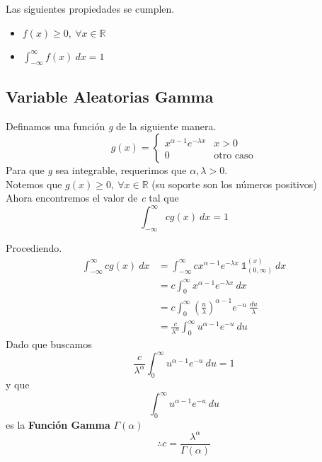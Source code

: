 Las siguientes propiedades se cumplen.
\begin{itemize}
  \item $f(x) \ge 0,~ \forall x \in \mathbb R$
  \item $\int_{-\infty}^{\infty} f(x)~dx = 1$
\end{itemize}



\subsection{Variable Aleatorias Gamma}

Definamos una función \textit{g} de la siguiente manera.
\[g(x) = 
  \begin{cases}
    x^{\alpha - 1}e^{-\lambda x} & x > 0\\
    0 & \text{otro caso}
  \end{cases}
\]
Para que \textit{g} sea integrable, requerimos que $\alpha, \lambda > 0$.\\
Notemos que $g(x) \ge 0,~ \forall x \in \mathbb R$ (su soporte son los números positivos)\\
Ahora encontremos el valor de \textit{c} tal que
\[\int_{-\infty}^{\infty}cg(x)~dx = 1\]

Procediendo.
\begin{align*}
  \int_{-\infty}^{\infty}cg(x)~dx &= \int_{-\infty}^{\infty}c x^{\alpha -1}e^{-\lambda x} ~ \mathbb 1_{(0, \infty)}^{(x)} ~dx\\
                                  &= c\int_0^{\infty} x^{\alpha -1}e^{-\lambda x} ~dx\\
                                  &= c\int_0^{\infty}(\frac  u\lambda)^{\alpha-1}e^{-u}~ \frac{du}\lambda \\
                                  &= \frac c{\lambda^\alpha} \int_0^{\infty} u^{\alpha - 1}e^{-u}~du
\end{align*}
Dado que buscamos 
\[\frac c{\lambda^\alpha} \int_0^{\infty} u^{\alpha - 1}e^{-u}~du = 1\] y que 
\[\int_0^{\infty} u^{\alpha - 1}e^{-u}~du\] es la \textbf{Función Gamma} $\Gamma(\alpha)$
\[\boxed{\therefore c = \frac{\lambda^\alpha}{\Gamma(\alpha)}}\]

